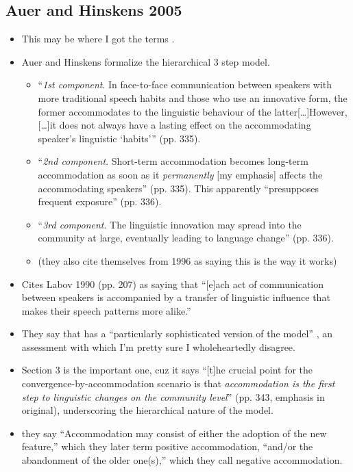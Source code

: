 \subsection{Auer and Hinskens 2005}
\begin{itemize}
    \item This may be where I got the terms \sla{}.
    \item Auer and Hinskens formalize the hierarchical 3 step model.
    \begin{itemize}
        \item ``\textit{1st component}. In face-to-face communication between speakers with more traditional speech habits and those who use an innovative form, the former accommodates to the linguistic behaviour of the latter[\ldots{}]However,[\ldots{}]it does not always have a lasting effect on the accommodating speaker’s linguistic `habits''' (pp. 335).
        \item ``\textit{2nd component}. Short-term accommodation becomes long-term accommodation as soon as it \emph{permanently} [my emphasis] affects the accommodating speakers'' (pp. 335). This apparently ``presupposes frequent exposure'' (pp. 336).
        \item ``\textit{3rd component}. The linguistic innovation may spread into the community at large, eventually leading to language change'' (pp. 336).
        \item (they also cite themselves from 1996 as saying this is the way it works)
    \end{itemize}
    \item Cites Labov 1990 (pp. 207) as saying that ``[e]ach act of communication between speakers is accompanied by a transfer of linguistic influence that makes their speech patterns more alike.'' 
    \item They say that \cite{trudgill1986dialects} has a ``particularly sophisticated version of the model'' \citep[p.336]{auer2005role}, an assessment with which I'm pretty sure I wholeheartedly disagree.
    \item Section 3 is the important one, cuz it says ``[t]he crucial point for the convergence-by-accommodation scenario is that \emph{accommodation is the first step to linguistic changes on the community level}'' (pp. 343, emphasis in original), underscoring the hierarchical nature of the model. 
    \item they say ``Accommodation may consist of either the adoption of the new feature,'' which they later term positive accommodation, ``and/or the abandonment of the older one(s),'' which they call negative accommodation.

\end{itemize}
